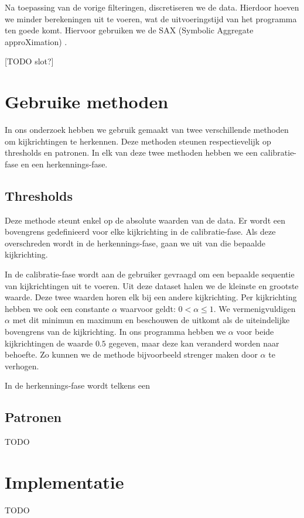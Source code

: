 \documentclass{article}
\begin{document}
Na toepassing van de vorige filteringen, discretiseren we de data. Hierdoor hoeven we minder berekeningen uit te voeren, wat de uitvoeringstijd van het programma ten goede komt. Hiervoor gebruiken we de SAX (Symbolic Aggregate approXimation) \cite{sax}. 

[TODO slot?]

\section{Gebruike methoden}

In ons onderzoek hebben we gebruik gemaakt van twee verschillende methoden om kijkrichtingen te herkennen. Deze methoden steunen respectievelijk op thresholds en patronen. In elk van deze twee methoden hebben we een calibratie-fase en een herkennings-fase.

\subsection{Thresholds}

Deze methode steunt enkel op de absolute waarden van de data. Er wordt een bovengrens gedefinieerd voor elke kijkrichting in de calibratie-fase. Als deze overschreden wordt in de herkennings-fase, gaan we uit van die bepaalde kijkrichting.

In de calibratie-fase wordt aan de gebruiker gevraagd om een bepaalde sequentie van kijkrichtingen uit te voeren. Uit deze dataset halen we de kleinste en grootste waarde. Deze twee waarden horen elk bij een andere kijkrichting. Per kijkrichting hebben we ook een constante $\alpha$ waarvoor geldt: $0 < \alpha \leq 1$. We vermenigvuldigen $\alpha$ met dit minimun en maximum en beschouwen de uitkomt als de uiteindelijke bovengrens van de kijkrichting. In ons programma hebben we $\alpha$ voor beide kijkrichtingen de waarde $0.5$ gegeven, maar deze kan veranderd worden naar behoefte. Zo kunnen we de methode bijvoorbeeld strenger maken door $\alpha$ te verhogen.

In de herkennings-fase wordt telkens een 

\subsection{Patronen}
TODO

\section{Implementatie}
TODO
\end{document}
